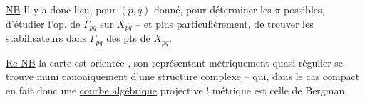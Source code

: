\uline{NB} Il y a donc lieu, pour  $(p,q)$ donné, pour déterminer les $\pi$ possibles, d'étudier  l'op. de $\Gamma_{pq}$ sur $X_{pq}$ -- et plus particulièrement, de trouver les   stabilisateurs dans $\Gamma_{pq}$ des pts de $X_{pq}$.

 \uline{Re NB}   la carte  est orientée ,  son représentant métriquement quasi-régulier se trouve muni canoniquement d'une structure \uline{complexe} -- qui, dans le cas compact   en fait donc une \uline{courbe algébrique} projective  !  métrique est celle de Bergman.


